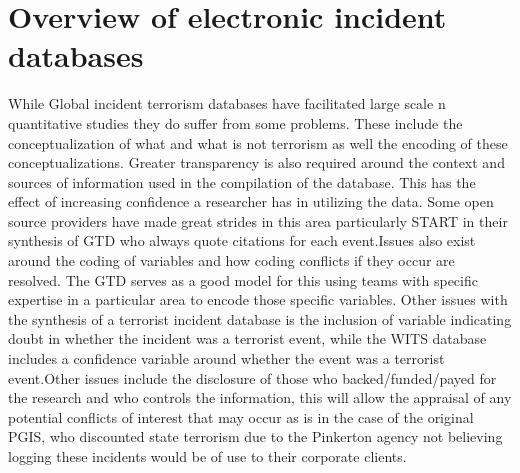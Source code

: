 \section{Overview of electronic incident databases}
While Global incident terrorism databases have facilitated large scale n quantitative studies they do suffer from some problems. These include the conceptualization of what and what is not terrorism as well the encoding of these conceptualizations.  Greater transparency is also required around the context and sources of information used in the compilation of the database. This has the effect of increasing confidence a researcher has in utilizing the data. Some open source providers have made great strides in this
area particularly START in their synthesis of GTD who always quote citations for each event.Issues also exist around the coding of variables and how coding conflicts if they occur are resolved. The GTD serves as a good model for this using teams with specific expertise in a particular area to encode those specific variables. Other issues with the synthesis of a terrorist incident database is the inclusion  of variable indicating doubt in whether the incident was a terrorist event, while the WITS database includes a confidence variable around whether the event was a terrorist event.Other issues include the disclosure of those who backed/funded/payed for the research and who controls the information, this will allow the appraisal of any potential conflicts of interest that may occur as is in the case of the original PGIS, who discounted state terrorism due to the Pinkerton agency not believing logging these incidents would be of use to their corporate clients. 



 
